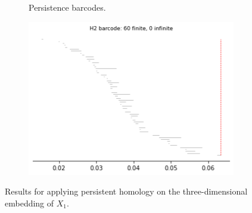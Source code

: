 \begin{figure}[H]
\begin{subfigure}[b]{0.24\textwidth}
        \caption{Persistence barcodes.}
\end{subfigure}
\begin{subfigure}[b]{0.24\textwidth}
\includegraphics[width=\textwidth]{figures/topology/X1_H2_barcode.png}
 \caption{}
\end{subfigure}
\caption{Results for applying persistent homology on the three-dimensional embedding of $X_1$.}
\end{figure}

